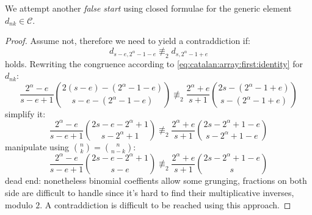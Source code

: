 We attempt another \emph{false start} using closed formulae for
the generic element $d_{nk}\in\mathcal{C}$.
\begin{proof}
Assume not, therefore we need to yield a contraddiction if:
\begin{displaymath}
    d_{s-e,2^{{\alpha}}-1-e} \not\equiv_{2} d_{s,2^{{\alpha}}-1+e}
\end{displaymath}
holds. Rewriting the congruence according to \autoref{eq:catalan:array:first:identity}
 for $d_{nk}$:
\begin{displaymath}
    \frac{2^{{\alpha}}-e}{s-e+1}{{2(s-e)-(2^{{\alpha}}-1-e)}\choose{s-e-(2^{{\alpha}}-1-e)}}
    \not\equiv_{2}
    \frac{2^{{\alpha}}+e}{s+1}{{2s-(2^{{\alpha}}-1+e)}\choose{s-(2^{{\alpha}}-1+e)}}
\end{displaymath}
simplify it:
\begin{displaymath}
    \frac{2^{{\alpha}}-e}{s-e+1}{{2s-e-2^{{\alpha}}+1}\choose{s-2^{{\alpha}}+1}}
    \not\equiv_{2}
    \frac{2^{{\alpha}}+e}{s+1}{{2s-2^{{\alpha}}+1-e}\choose{s-2^{{\alpha}}+1-e}}
\end{displaymath}
manipulate using ${{n}\choose{k}}={{n}\choose{n-k}}$:
\begin{displaymath}
    \frac{2^{{\alpha}}-e}{s-e+1}{{2s-e-2^{{\alpha}}+1}\choose{s-e}}
    \not\equiv_{2}
    \frac{2^{{\alpha}}+e}{s+1}{{2s-2^{{\alpha}}+1-e}\choose{s}}
\end{displaymath}
dead end: nonetheless binomial coeffients allow some grunging,
fractions on both side are difficult to handle since it's hard
to find their multiplicative inverses, modulo $2$. A contraddiction
is difficult to be reached using this approach.
\end{proof} 

